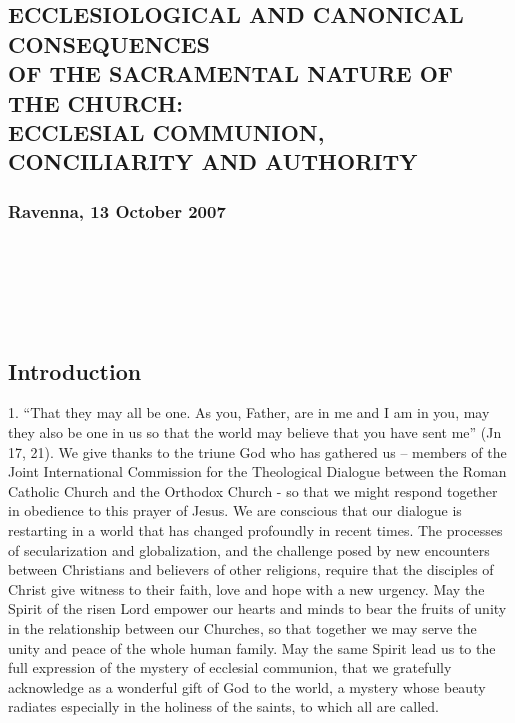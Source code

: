 \subsection{\texorpdfstring{ECCLESIOLOGICAL AND CANONICAL
CONSEQUENCES~\\
OF THE SACRAMENTAL NATURE OF THE CHURCH:\\
ECCLESIAL COMMUNION, CONCILIARITY AND
AUTHORITY}{ECCLESIOLOGICAL AND CANONICAL CONSEQUENCES~ OF THE SACRAMENTAL NATURE OF THE CHURCH: ECCLESIAL COMMUNION, CONCILIARITY AND AUTHORITY}}\label{ecclesiological-and-canonical-consequences-of-the-sacramental-nature-of-the-church-ecclesial-communion-conciliarity-and-authority}

\subsubsection{Ravenna, 13 October 2007}\label{ravenna-13-october-2007}

\subsubsection{~}\label{section}

\subsection{\texorpdfstring{\textbf{\textbf{{~}}}}{~}}\label{section-1}

\subsection{Introduction}\label{introduction}

1. ``That they may all be one. As you, Father, are in me and I am in
you, may they also be one in us so that the world may believe that you
have sent me'' (Jn 17, 21). We give thanks to the triune God who has
gathered us -- members of the Joint International Commission for the
Theological Dialogue between the Roman Catholic Church and the Orthodox
Church - so that we might respond together in obedience to this prayer
of Jesus. We are conscious that our dialogue is restarting in a world
that has changed profoundly in recent times. The processes of
secularization and globalization, and the challenge posed by new
encounters between Christians and believers of other religions, require
that the disciples of Christ give witness to their faith, love and hope
with a new urgency. May the Spirit of the risen Lord empower our hearts
and minds to bear the fruits of unity in the relationship between our
Churches, so that together we may serve the unity and peace of the whole
human family. May the same Spirit lead us to the full expression of the
mystery of ecclesial communion, that we gratefully acknowledge as a
wonderful gift of God to the world, a mystery whose beauty radiates
especially in the holiness of the saints, to which all are called.

